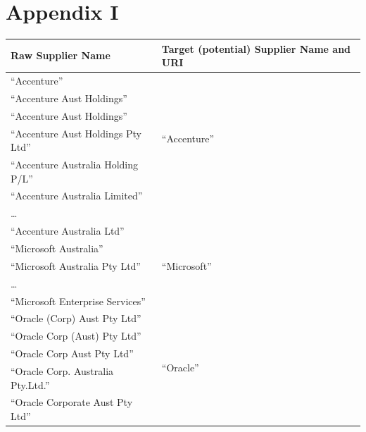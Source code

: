 \documentclass{llncs}
\begin{document}


\newpage
\section*{Appendix I}
\begin{table}[!htb]
\renewcommand{\arraystretch}{1.3}
\begin{center}
\begin{tabular}{|p{7cm}|p{7cm}|}
\hline
  \textbf{Raw Supplier Name} & \textbf{Target (potential) Supplier Name and URI}  \\  \hline
  ``Accenture'' & \multirow{6}{*}{``Accenture''} \\
  ``Accenture Aust Holdings'' & \multirow{6}{*}{\scriptsize\url{http://live.dbpedia.org/resource/Accenture}} \\ 
   ``Accenture Aust Holdings'' & \\  
   ``Accenture Aust Holdings Pty Ltd'' & \\
   ``Accenture  Australia Holding P/L'' & \\
  ``Accenture Australia Limited'' & \\
  \ldots  & \\
  ``Accenture Australia Ltd'' & \\ \hline
  ``Microsoft Australia'' & \multirow{3}{*}{``Microsoft''} \\
  ``Microsoft Australia Pty Ltd'' & \multirow{3}{*}{\scriptsize\url{http://live.dbpedia.org/resource/Microsoft}} \\
  \ldots  & \\
  ``Microsoft Enterprise Services'' & \\ \hline
  ``Oracle (Corp) Aust Pty Ltd''  & \multirow{9}{*}{``Oracle''} \\
  ``Oracle Corp (Aust) Pty Ltd''  & \multirow{9}{*}{\scriptsize\url{http://live.dbpedia.org/resource/Oracle_Corporation}} \\
  ``Oracle Corp Aust Pty Ltd'' & \\
  ``Oracle Corp. Australia Pty.Ltd.'' & \\
  ``Oracle Corporate Aust Pty Ltd'' & \\

\end{tabular}
\end{center}
\end{table}
\end{document}
